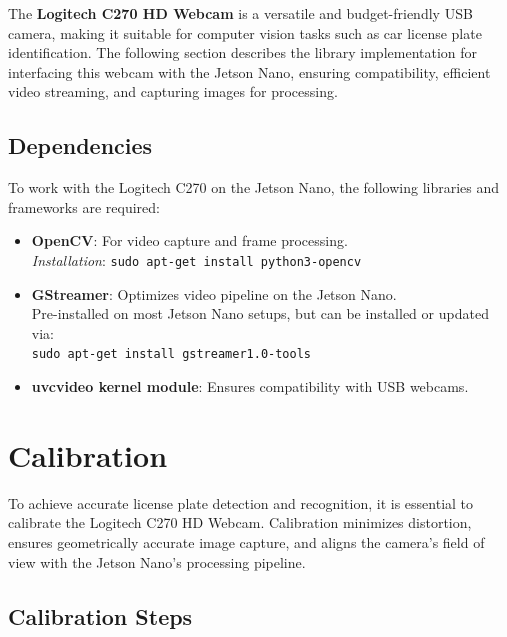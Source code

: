 The \textbf{Logitech C270 HD Webcam} is a versatile and budget-friendly USB camera, making it suitable for computer vision tasks such as car license plate identification. The following section describes the library implementation for interfacing this webcam with the Jetson Nano, ensuring compatibility, efficient video streaming, and capturing images for processing.

\subsection{Dependencies}

To work with the Logitech C270 on the Jetson Nano, the following libraries and frameworks are required:

\begin{itemize}
	\item \textbf{OpenCV}: For video capture and frame processing.\\
	\textit{Installation}: \texttt{sudo apt-get install python3-opencv}
	\item \textbf{GStreamer}: Optimizes video pipeline on the Jetson Nano.\\
	Pre-installed on most Jetson Nano setups, but can be installed or updated via:\\
	\texttt{sudo apt-get install gstreamer1.0-tools}
	\item \textbf{uvcvideo kernel module}: Ensures compatibility with USB webcams. \cite{UBT:2024}
\end{itemize}

\section{Calibration}

To achieve accurate license plate detection and recognition, it is essential to calibrate the Logitech C270 HD Webcam. Calibration minimizes distortion, ensures geometrically accurate image capture, and aligns the camera's field of view with the Jetson Nano's processing pipeline.

\subsection{Calibration Steps}


